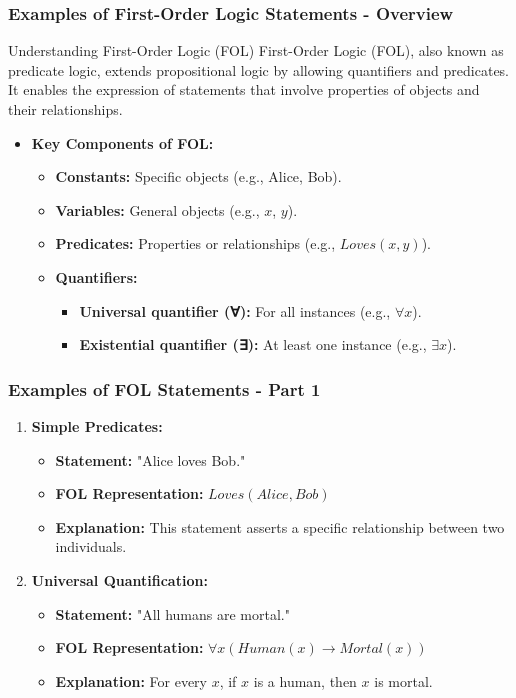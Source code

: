 \documentclass[aspectratio=169]{beamer}
\begin{document}
\begin{frame}[fragile]
    \frametitle{Examples of First-Order Logic Statements - Overview}
    \begin{block}{Understanding First-Order Logic (FOL)}
        First-Order Logic (FOL), also known as predicate logic, extends propositional logic by allowing quantifiers and predicates. It enables the expression of statements that involve properties of objects and their relationships.
    \end{block}
    
    \begin{itemize}
        \item \textbf{Key Components of FOL:}
        \begin{itemize}
            \item \textbf{Constants:} Specific objects (e.g., Alice, Bob).
            \item \textbf{Variables:} General objects (e.g., $x$, $y$).
            \item \textbf{Predicates:} Properties or relationships (e.g., $Loves(x, y)$).
            \item \textbf{Quantifiers:} 
            \begin{itemize}
                \item \textbf{Universal quantifier (∀):} For all instances (e.g., $\forall x$).
                \item \textbf{Existential quantifier (∃):} At least one instance (e.g., $\exists x$).
            \end{itemize}
        \end{itemize}
    \end{itemize}
\end{frame}

\begin{frame}[fragile]
    \frametitle{Examples of FOL Statements - Part 1}
    \begin{enumerate}
        \item \textbf{Simple Predicates:}
        \begin{itemize}
            \item \textbf{Statement:} "Alice loves Bob."
            \item \textbf{FOL Representation:} $Loves(Alice, Bob)$
            \item \textbf{Explanation:} This statement asserts a specific relationship between two individuals.
        \end{itemize}

        \item \textbf{Universal Quantification:}
        \begin{itemize}
            \item \textbf{Statement:} "All humans are mortal."
            \item \textbf{FOL Representation:} $\forall x (Human(x) \rightarrow Mortal(x))$
            \item \textbf{Explanation:} For every $x$, if $x$ is a human, then $x$ is mortal.
        \end{itemize}
    \end{enumerate}
\end{frame}
\end{document}
